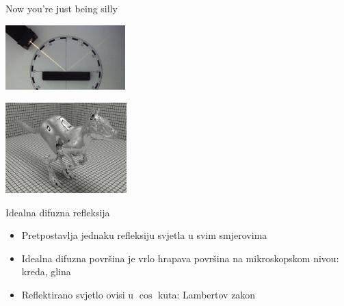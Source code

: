 \documentclass[9pt]{beamer}
\begin{document}
\begin{frame}{Now you're just being silly}
{\begin{center}
	\end{center}
} {
\begin{center}
	\includegraphics[height=2.5cm]{slike/slide_048_cropped.jpg}
\end{center}
}
 {
	\begin{center}
		\includegraphics[height=3.5cm]{slike/slide_049_cropped.jpg}
	\end{center}
}
\end{frame}

\begin{frame}{Idealna difuzna refleksija}
	\begin{itemize} %
		\item Pretpostavlja jednaku refleksiju svjetla u svim smjerovima
		\item Idealna difuzna površina je vrlo hrapava površina na mikroskopskom nivou: kreda, glina
		\item Reflektirano svjetlo ovisi u $\cos$ kuta: Lambertov zakon
	\end{itemize}
\end{frame}
\end{document}

